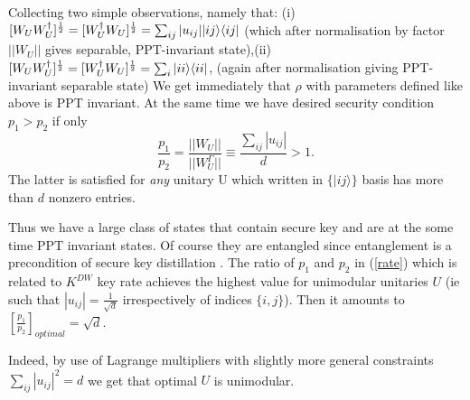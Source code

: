 \documentclass[twocolumn,prl,aps]{revtex4}
\def\>{\rangle}
\begin{document}
Collecting two simple observations, namely that:
(i) $[W_U W_U^{\dagger}]^{1\over 2}= 
[W_U^{\dagger}W_U]^{1\over 2}=\sum_{ij} |u_{ij}| 
|ij \rangle \langle ij|$ (which after normalisation 
by factor $||W_U||$ gives separable, PPT-invariant 
state),(ii) $[W_U W_U^{\dagger}]^{1\over 2}= 
[W_U^{\dagger}W_U]^{1\over 2}=\sum_{i} | ii \rangle \langle ii|$, 
(again after normalisation giving  PPT-invariant separable state)
We get immediately that $\rho$ with 
parameters defined like above is PPT invariant.
At the same time we have desired security condition
$p_{1}>p_{2}$ 
if only 
\begin{equation}
\frac{p_{1}}{p_{2}}=\frac{||W_U||}{||W_U^{\Gamma}||} \equiv
\frac{\sum_{ij} |u_{ij}|}{d} > 1.
\label{rate}
\end{equation}
The latter is satisfied for {\it any} unitary U which written in $\{|ij\>\}$ basis
has more than $d$ nonzero entries.

Thus we have a large class of states that contain secure 
key and are at the some time PPT invariant states.
Of course they are entangled since entanglement 
is a precondition of secure key distillation \cite{Curty04:key-ent}.
{\obs
The ratio of $p_1$ and $p_2$ in (\ref{rate}) which is related to
$K^{DW}$ key rate achieves the highest value for unimodular 
unitaries $U$ (ie such that $|u_{ij}|=\frac{1}{\sqrt{d}}$  
irrespectively of indices $\{ i, j\}$). Then it 
amounts to $[\frac{p_{1}}{p_{2}}]_{optimal}= \sqrt{d}$.
}

Indeed, by use of Lagrange multipliers with slightly more general constraints 
$\sum_{ij} |u_{ij}|^2 = d$ we get that optimal $U$ is unimodular. 

\end{document}
